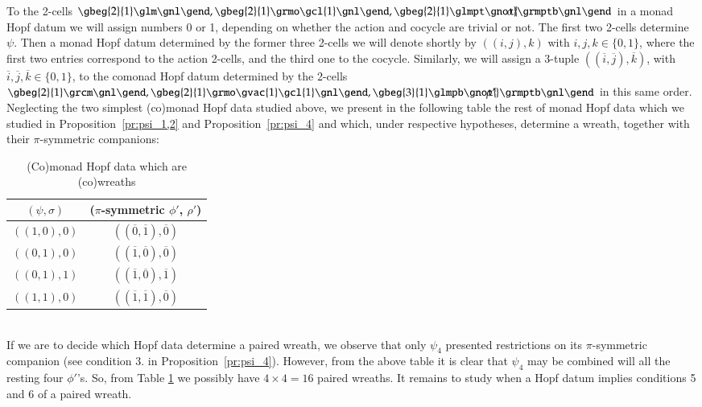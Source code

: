\documentclass[a4paper, 12pt]{article}
\renewcommand{\_}[1]{\mbox{$_{\left( #1 \right)}$}}
\theoremstyle{plain}
\newcommand{\crta}{\overline}
\newcommand{\prref}[1]{Proposition~\ref{pr:#1}}
\begin{document}
To the 2-cells 
$\gbeg{2}{1}
\glm \gnl
\gend, %
\gbeg{2}{1}
\grmo \gcl{1} \gnl 
\gend, %
\gbeg{2}{1}
\glmpt \gnot{\hspace{-0,34cm}\sigma} \grmptb \gnl
\gend 
$ \hspace{0,1cm}
in a monad Hopf datum we will assign numbers 0 or 1, depending on whether the action and cocycle are trivial or not. The first two 2-cells determine $\psi$. 
Then a monad Hopf datum determined by the former three 2-cells we will denote shortly by $((i,j),k)$ with $i,j,k\in\{0,1\}$, where the first two entries correspond to the action 2-cells, 
and the third one to the cocycle. Similarly, we will assign a 3-tuple $((\crta i,\crta j),\crta k)$, with $\crta i,\crta j,\crta k\in\{0,1\}$,  to the comonad Hopf datum determined by the 
2-cells 
$\gbeg{2}{1}
\grcm \gnl
\gend, 
\gbeg{2}{1}
\grmo \gvac{1} \gcl{1} \gnl
\gend, 
\gbeg{3}{1}
\glmpb \gnot{\hspace{-0,34cm}\rho'} \grmptb \gnl
\gend$ in this same order. Neglecting the two simplest (co)monad Hopf data studied above, we present in the following table the rest of monad Hopf data which we studied in \prref{psi_1,2} and 
\prref{psi_4} and which, under respective hypotheses, determine a wreath, together with their $\pi$-symmetric companions: 
\begin{table}[h!]
\begin{center}
\begin{tabular}{ c c } %
 $(\psi, \sigma)$ & \hspace{0,2cm} ($\pi$-symmetric $\phi'$, $\rho'$) \\ [0.5ex]
\hline
$ ((1,0),0)$ & $((\crta 0,\crta 1),\crta 0)$ \\ [1ex]   
 $((0,1),0)$ & $((\crta 1,\crta 0),\crta 0)$  \\ [1ex]
 $((0,1),1)$ & $((\crta 1,\crta 0),\crta 1)$  \\ [1ex]
 $((1,1),0)$ & $((\crta 1,\crta 1),\crta 0)$  \\ [1ex]
\end{tabular}
\caption{(Co)monad Hopf data which are (co)wreaths}
\label{table:1}
\end{center}
\end{table}\\ %
\indent If we are to decide which Hopf data determine a paired wreath, we observe that only $\psi_4$ presented restrictions on its $\pi$-symmetric companion (see condition 3. in \prref{psi_4}). 
However, from the above table it is clear that $\psi_4$ may be combined will all the resting four $\phi'$'s. So, from Table \ref{table:1} we possibly have $4\times 4=16$ paired wreaths. 
It remains to study when a Hopf datum implies conditions 5 and 6 of a paired wreath. 
\end{document}
